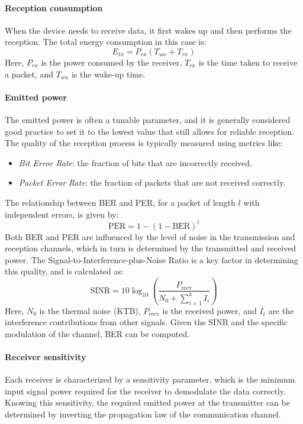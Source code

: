 \paragraph*{Reception consumption}
When the device needs to receive data, it first wakes up and then performs the reception. 
The total energy consumption in this case is:
\[E_{tx}=P_{rx}(T_{uw}+T_{rx})\]
Here, $P_{rx}$ is the power consumed by the receiver, $T_{rx}$ is the time taken to receive a packet, and $T_{wu}$ is the wake-up time.

\paragraph*{Emitted power}
The emitted power is often a tunable parameter, and it is generally considered good practice to set it to the lowest value that still allows for reliable reception. 
The quality of the reception process is typically measured using metrics like:
\begin{itemize}
    \item \textit{Bit Error Rate}: the fraction of bits that are incorrectly received. 
    \item \textit{Packet Error Rate}: the fraction of packets that are not received correctly.
\end{itemize}
The relationship between BER and PER, for a packet of length $l$ with independent errors, is given by:
\[\text{PER}=1-(1-\text{BER})^l\]
Both BER and PER are influenced by the level of noise in the transmission and reception channels, which in turn is determined by the transmitted and received power. 
The Signal-to-Interference-plus-Noise Ratio is a key factor in determining this quality, and is calculated as:
\[\text{SINR}=10\log_{10}\left(\dfrac{P_{\text{recv}}}{N_0+\sum_{i=1}^{k}I_i}\right)\]
Here, $N_0$ is the thermal noise (KTB), $P_{\text{recv}}$ is the received power, and $I_i$ are the interference contributions from other signals.
Given the SINR and the specific modulation of the channel, BER can be computed.

\paragraph*{Receiver sensitivity}
Each receiver is characterized by a sensitivity parameter, which is the minimum input signal power required for the receiver to demodulate the data correctly. 
Knowing this sensitivity, the required emitted power at the transmitter can be determined by inverting the propagation law of the communication channel.

